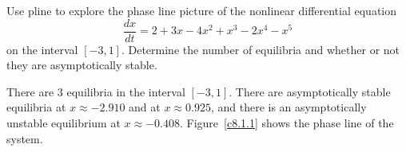 \documentclass{ximera}
\begin{document}
\begin{computerExercise} \label{c8.1.1}
Use {\sf pline} to explore the phase line 
picture of the nonlinear differential equation
\[
\frac{dx}{dt} = 2 + 3x - 4x^2 + x^3 - 2x^4 -x^5
\]
on the interval $[-3,1]$.  Determine the number of equilibria
and whether or not they are asymptotically stable.

\begin{solution}

There are 3 equilibria in the interval $[-3,1]$.  There are
asymptotically stable equilibria at $x\approx -2.910$ and at 
$x\approx 0.925$, and there is an asymptotically unstable equilibrium at
$x \approx -0.408$.  Figure~\ref{c8.1.1} shows the phase line
of the system.

\begin{figure}[htb]
                       \centerline{%
                       }
\end{figure}

\end{solution}
\end{computerExercise}
\end{document}
